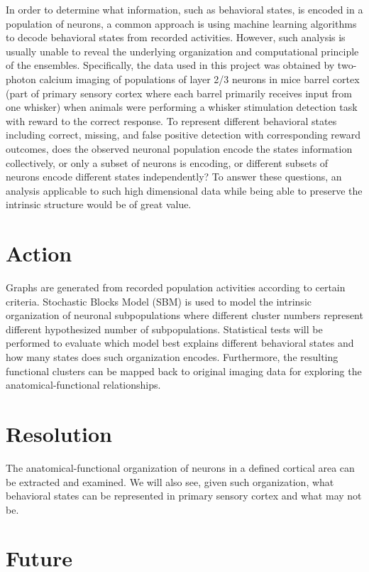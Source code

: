 \documentclass{article}
\begin{document}
In order to determine what information, such as behavioral states, is encoded in a population of neurons, a common approach is using machine learning algorithms to decode behavioral states from recorded activities. However, such analysis is usually unable to reveal the underlying organization and computational principle of the ensembles. Specifically, the data used in this project was obtained by two-photon calcium imaging of populations of layer 2/3 neurons in mice barrel cortex (part of primary sensory cortex where each barrel primarily receives input from one whisker) when animals were performing a whisker stimulation detection task with reward to the correct response. To represent different behavioral states including correct, missing, and false positive detection with corresponding reward outcomes, does the observed neuronal population encode the states information collectively, or only a subset of neurons is encoding, or different subsets of neurons encode different states independently? To answer these questions, an analysis applicable to such high dimensional data while being able to preserve the intrinsic structure would be of great value. 

\section{Action}

Graphs are generated from recorded population activities according to certain criteria. Stochastic Blocks Model (SBM) is used to model the intrinsic organization of neuronal subpopulations where different cluster numbers represent different hypothesized number of subpopulations. Statistical tests will be performed to evaluate which model best explains different behavioral states and how many states does such organization encodes. Furthermore, the resulting functional clusters can be mapped back to original imaging data for exploring the anatomical-functional relationships. 


\section{Resolution}

The anatomical-functional organization of neurons in a defined cortical area can be extracted and examined. We will also see, given such organization, what behavioral states can be represented in primary sensory cortex and what may not be. 


\section{Future}
\end{document}
